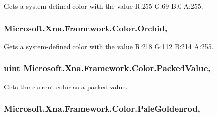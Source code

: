 Gets a system-\/defined color with the value R\+:255 G\+:69 B\+:0 A\+:255.

\hypertarget{struct_microsoft_1_1_xna_1_1_framework_1_1_color_a08aa26c9ad02eaf6158a41a1afe9652b}{}
\subsubsection[{Orchid}]{ Microsoft.\+Xna.\+Framework.\+Color.\+Orchid\hspace{0.3cm}{\ttfamily [static]}, {\ttfamily [get]}}\label{struct_microsoft_1_1_xna_1_1_framework_1_1_color_a08aa26c9ad02eaf6158a41a1afe9652b}


Gets a system-\/defined color with the value R\+:218 G\+:112 B\+:214 A\+:255.

\hypertarget{struct_microsoft_1_1_xna_1_1_framework_1_1_color_a21cac7988be47762452b0ccc02c9c726}{}
\subsubsection[{Packed\+Value}]{\setlength{\rightskip}{0pt plus 5cm}uint Microsoft.\+Xna.\+Framework.\+Color.\+Packed\+Value\hspace{0.3cm}{\ttfamily [get]}, {\ttfamily [set]}}\label{struct_microsoft_1_1_xna_1_1_framework_1_1_color_a21cac7988be47762452b0ccc02c9c726}


Gets the current color as a packed value.

\hypertarget{struct_microsoft_1_1_xna_1_1_framework_1_1_color_a828970172f983fc3af0ecbf368943212}{}
\subsubsection[{Pale\+Goldenrod}]{ Microsoft.\+Xna.\+Framework.\+Color.\+Pale\+Goldenrod\hspace{0.3cm}{\ttfamily [static]}, {\ttfamily [get]}}\label{struct_microsoft_1_1_xna_1_1_framework_1_1_color_a828970172f983fc3af0ecbf368943212}


